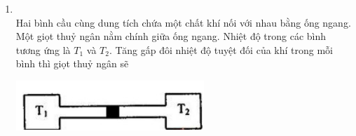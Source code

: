 \begin{enumerate}[label=\bfseries Câu \arabic*:, leftmargin=1.7cm]
\item{}\\
Hai bình cầu cùng dung tích chứa một chất khí nối với nhau bằng ống ngang. Một giọt thuỷ ngân nằm chính giữa ống ngang. Nhiệt độ trong các bình tương ứng là $T_1$ và $T_2$. Tăng gấp đôi nhiệt độ tuyệt đối của khí trong mỗi bình thì giọt thuỷ ngân sẽ
\begin{center}
	\includegraphics[width=0.35\linewidth]{../figs/VN12-Y24-PH-SYL-012P-4}
\end{center}



\end{enumerate}
